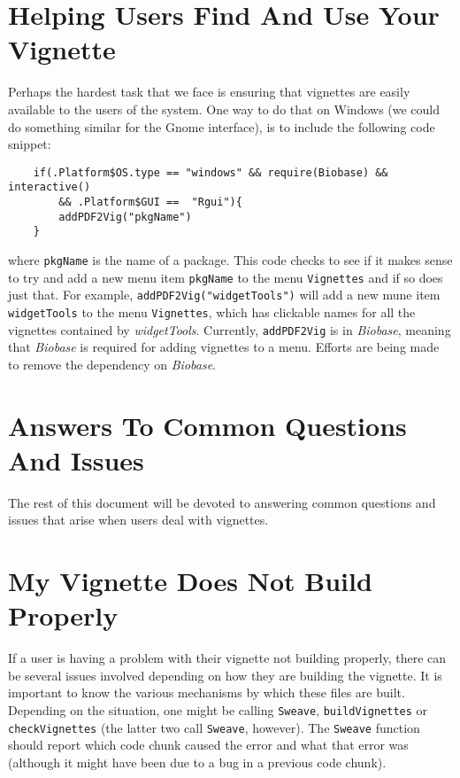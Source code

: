 \documentclass{article}
\newcommand{\Rfunction}[1]{{\texttt{#1}}}
\newcommand{\Rpackage}[1]{{\textit{#1}}}
\begin{document}
\section*{Helping Users Find And Use Your Vignette}

Perhaps the hardest task that we face is ensuring that vignettes are
easily available to the users of the system. One way to do that on
Windows (we could do something similar for the Gnome interface), is
to include the following code snippet:
\begin{verbatim}
    if(.Platform$OS.type == "windows" && require(Biobase) && interactive()
        && .Platform$GUI ==  "Rgui"){
        addPDF2Vig("pkgName")
    }
\end{verbatim}

where \texttt{pkgName} is the name of a package. This code checks to
see if it makes sense to try and add a new menu item \texttt{pkgName}
to the menu \texttt{Vignettes} and if so
does just that. For example, \Rfunction{addPDF2Vig("widgetTools")}
will add a new mune item \texttt{widgetTools} to the menu
\texttt{Vignettes}, which has clickable names for all the vignettes
contained by \Rpackage{widgetTools}. Currently, \Rfunction{addPDF2Vig} is
in \Rpackage{Biobase}, meaning that \Rpackage{Biobase} is required for
adding vignettes to a menu. Efforts are being made to remove the dependency on
\Rpackage{Biobase}. 

\section*{Answers To Common Questions And Issues}

The rest of this document will be devoted to answering common
questions and issues that arise when users deal with vignettes.  

\section*{My Vignette Does Not Build Properly}

If a user is having a problem with their vignette not building
properly, there can be several issues involved depending on how they
are building the vignette.  It is important to know the various
mechanisms by which these files are built.  Depending on the
situation, one might be calling \Rfunction{Sweave},
\Rfunction{buildVignettes} or \Rfunction{checkVignettes} (the latter
two call \Rfunction{Sweave}, however).  The \Rfunction{Sweave}
function should report which code chunk caused the error and what that
error was (although it might have been due to a bug in a previous code
chunk).  
\end{document}

